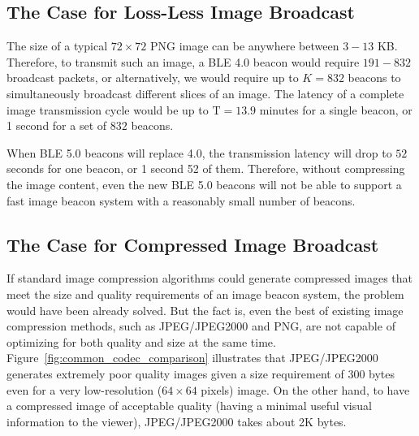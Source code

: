 \subsection{The Case for Loss-Less Image Broadcast}

The size of a typical $72\times 72$ PNG image can be anywhere between $3-13$ KB. Therefore, to transmit such an image, a BLE 4.0 beacon would require $191-832$ broadcast packets, or alternatively, we would require up to $K = 832$ beacons to simultaneously broadcast different slices of an image. The latency of a complete image transmission cycle would be up to $\mathrm{T = 13.9}$ minutes for a single beacon, or 1 second for a set of $832$ beacons.

When BLE 5.0 beacons will replace 4.0, the transmission latency will drop to $52$ seconds for one beacon, or 1 second 52 of them. Therefore, without compressing the image content, even the new BLE 5.0 beacons will not be able to support a fast image beacon system with a reasonably small number of beacons.


\subsection{The Case for Compressed Image Broadcast}

If standard image compression algorithms could generate compressed images that meet the size and quality requirements of an image beacon system, the problem would have been already solved. But the fact is, even the best of existing image compression methods, such as JPEG/JPEG2000 and PNG, are not capable of optimizing for both quality and size at the same time. Figure~\ref{fig:common_codec_comparison} illustrates that JPEG/JPEG2000 generates extremely poor quality images given a size requirement of 300 bytes even for a very low-resolution ($64 \times 64$ pixels) image. On the other hand, to have a compressed image of acceptable quality (having a minimal useful visual information to the viewer), JPEG/JPEG2000 takes about 2K bytes.


